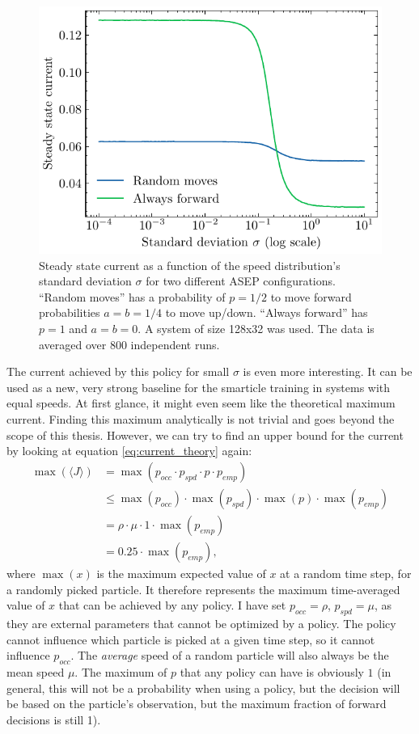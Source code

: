 \begin{figure}[H]
    \centering
    \includegraphics{steady_state_current_both_log.pdf}
    \caption{Steady state current as a function of the speed distribution's standard deviation $\sigma$ for two different ASEP configurations. \enquote{Random moves} has a probability of $p=1/2$ to move forward probabilities $a=b=1/4$ to move up/down. \enquote{Always forward} has $p=1$ and $a=b=0$. A system of size 128x32 was used. The data is averaged over 800 independent runs.}
    \label{fig:steady_state_current_always_forward}
\end{figure}
The current achieved by this policy for small $\sigma$ is even more interesting. It can be used as a new, very strong baseline for the smarticle training in systems with equal speeds. At first glance, it might even seem like the theoretical maximum current. Finding this maximum analytically is not trivial and goes beyond the scope of this thesis. However, we can try to find an upper bound for the current by looking at equation \ref{eq:current_theory} again:
\begin{align*}
    \max(\langle J\rangle) &= \max(p_{occ} \cdot p_{spd} \cdot p \cdot p_{emp}) \\
                           &\le \max(p_{occ}) \cdot \max(p_{spd}) \cdot \max(p) \cdot \max(p_{emp}) \\
                           &= \rho \cdot \mu \cdot 1 \cdot \max(p_{emp}) \\
                            &= 0.25 \cdot \max(p_{emp})\text{,}
\end{align*}
where $\max(x)$ is the maximum expected value of $x$ at a random time step, for a randomly picked particle. It therefore represents the maximum time-averaged value of $x$ that can be achieved by any policy. I have set $p_{occ}=\rho$, $p_{spd}=\mu$, as they are external parameters that cannot be optimized by a policy. The policy cannot influence which particle is picked at a given time step, so it cannot influence $p_{occ}$. The \textit{average} speed of a random particle will also always be the mean speed $\mu$. The maximum of $p$ that any policy can have is obviously $1$ (in general, this will not be a probability when using a policy, but the decision will be based on the particle's observation, but the maximum fraction of forward decisions is still 1). 
